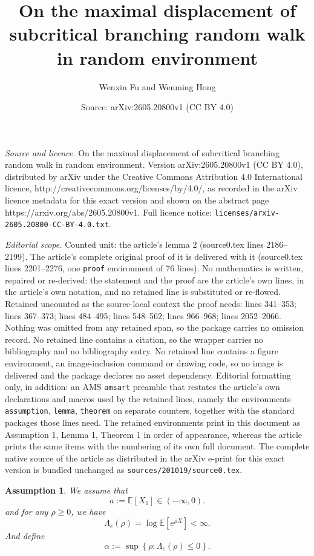\documentclass[10pt,a4paper]{amsart}
\title{On the maximal displacement of subcritical branching random walk in random environment}
\author{Wenxin Fu and Wenming Hong}
\date{Source: arXiv:2605.20800v1 (CC BY 4.0)}
\newtheorem{assumption}{Assumption}
\newcommand{\E}{\mathbb{E}}
\begin{document}
\maketitle

\noindent\emph{Source and licence.} On the maximal displacement of subcritical branching random walk in random environment. Version arXiv:2605.20800v1 (CC BY 4.0), distributed by arXiv under the Creative Commons Attribution 4.0 International licence, http://creativecommons.org/licenses/by/4.0/, as recorded in the arXiv licence metadata for this exact version and shown on the abstract page https://arxiv.org/abs/2605.20800v1. Full licence notice: \texttt{licenses/arxiv-2605.20800-CC-BY-4.0.txt}.\par\smallskip

\noindent\textit{Editorial scope.} Counted unit: the article's lemma 2 (source0.tex lines 2186--2199). The article's complete original proof of it is delivered with it (source0.tex lines 2201--2276, one \texttt{proof} environment of 76 lines). No mathematics is written, repaired or re-derived: the statement and the proof are the article's own lines, in the article's own notation, and no retained line is substituted or re-flowed.  Retained uncounted as the source-local context the proof needs: lines 341--353; lines 367--373; lines 484--495; lines 548--562; lines 966--968; lines 2052--2066.  Nothing was omitted from any retained span, so the package carries no omission record.  No retained line contains a citation, so the wrapper carries no bibliography and no bibliography entry.  No retained line contains a figure environment, an image-inclusion command or drawing code, so no image is delivered and the package declares no asset dependency.  Editorial formatting only, in addition: an AMS \texttt{amsart} preamble that restates the article's own declarations and macros used by the retained lines, namely the environments \texttt{assumption}, \texttt{lemma}, \texttt{theorem} on separate counters, together with the standard packages those lines need.  The retained environments print in this document as Assumption 1, Lemma 1, Theorem 1 in order of appearance, whereas the article prints the same items with the numbering of its own full document.  The complete native source of the article as distributed in the arXiv e-print for this exact version is bundled unchanged as \texttt{sources/201019/source0.tex}.
	\begin{assumption}\label{subcritical}
		We assume that
		\begin{equation}
			a:=\E[X_1]\in (-\infty,0).
		\end{equation}
		and for any $\rho\geqslant0$, we have
		\begin{equation}
			\Lambda_e(\rho) = \log \E \left[ e^{\rho X} \right] <\infty.
		\end{equation}
	And define \begin{equation}\label{def of alpha}
	 \alpha:=\sup\left\{\rho:\Lambda_e(\rho)\leqslant 0\right\}.
	\end{equation}
	\end{assumption}
\end{document}
